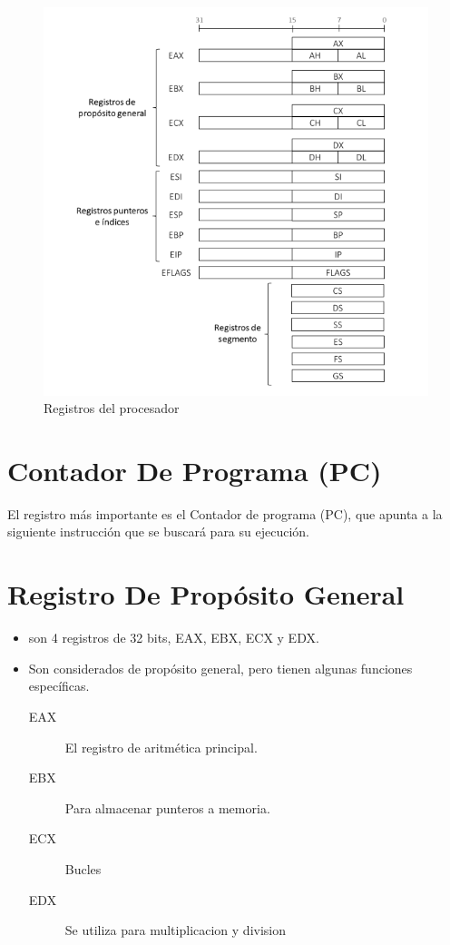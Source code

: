 \documentclass[12pt]{article}
\begin{document}
\setlength\parindent{0pt}   %
\setlength{\parskip}{1.2em}
\maketitle
\begin{figure}[htbp]
\centering
\includegraphics[width=.9\linewidth]{img/registros.png}
\caption{Registros del procesador}
\end{figure}

\section*{Contador De Programa (PC)}
\label{sec:orge46cac3}
El registro más importante es el Contador de programa (PC),
que apunta a la siguiente instrucción que se buscará para su
ejecución.

\section*{Registro De Propósito General}
\label{sec:orge1976f8}
\begin{itemize}
\item son 4 registros de 32 bits, EAX, EBX, ECX y EDX.
\item Son considerados de propósito general, pero tienen algunas funciones específicas.
\begin{description}
\item[{EAX}] El registro de aritmética principal.
\item[{EBX}] Para almacenar punteros a memoria.
\item[{ECX}] Bucles
\item[{EDX}] Se utiliza para multiplicacion y division
\end{description}
\end{itemize}
\end{document}
